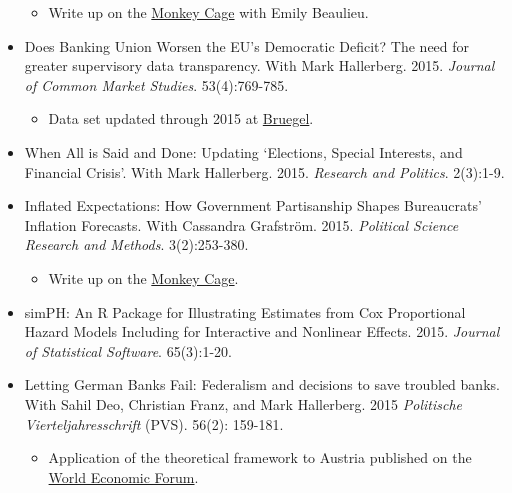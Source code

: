 \documentclass[a4paper]{article}
\begin{document}
\begin{itemize}
\begin{itemize}
            \item Write up on the \href{http://t.co/fETbFCXcYU}{Monkey Cage} with Emily Beaulieu.

        \end{itemize}

    \item Does Banking Union Worsen the EU's Democratic Deficit? The need for greater supervisory data transparency. With Mark Hallerberg. 2015. {\emph{Journal of Common Market Studies}}. 53(4):769-785.

        \begin{itemize}
            \item Data set updated through 2015 at \href{http://bruegel.org/2016/05/the-european-union-remains-a-laggard-on-banking-supervisory-transparency/}{Bruegel}.
        \end{itemize}

    \item When All is Said and Done: Updating `Elections, Special Interests, and Financial Crisis'. With Mark Hallerberg. 2015. \emph{Research and Politics}. 2(3):1-9.

    \item Inflated Expectations: How Government Partisanship Shapes Bureaucrats' Inflation Forecasts. With Cassandra Grafstr\"{o}m. 2015. {\emph{Political Science Research and Methods}}. 3(2):253-380.

    \begin{itemize}
        \item Write up on the \href{http://www.washingtonpost.com/blogs/monkey-cage/wp/2015/01/28/the-fed-cant-accurately-forecast-inflation-heres-why-this-may-hurt-democrats/}{Monkey Cage}.
    \end{itemize}

    \item simPH: An R Package for Illustrating Estimates from Cox Proportional Hazard Models Including for Interactive and Nonlinear Effects. 2015. {\emph{Journal of Statistical Software}}. 65(3):1-20.

    \item Letting German Banks Fail: Federalism and decisions to save troubled banks. With Sahil Deo, Christian Franz, and Mark Hallerberg. 2015 \emph{Politische Vierteljahresschrift} (PVS). 56(2): 159-181.

        \begin{itemize}
            \item Application of the theoretical framework to Austria published on the \href{https://www.weforum.org/agenda/2015/03/a-bank-bailout-lesson-from-austria/}{World Economic Forum}.
        \end{itemize}


\end{itemize}
\end{document}
